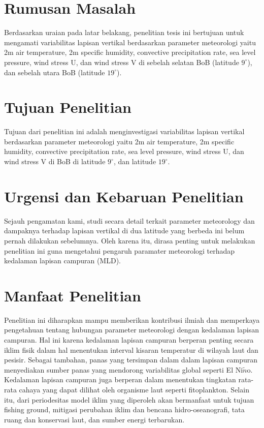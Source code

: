 \begin{spacing}{1.5}
	\section[Rumusan Masalah]{Rumusan Masalah}
	Berdasarkan uraian pada latar belakang, penelitian tesis ini bertujuan untuk mengamati variabilitas lapisan vertikal berdasarkan parameter meteorologi yaitu 2m air temperature, 2m specific humidity, convective precipitation rate, sea level pressure, wind stress U, dan wind stress V di sebelah selatan BoB (latitude $9^\circ$), dan sebelah utara BoB (latitude $19^\circ$).
	
	\section[Tujuan Penelitian]{Tujuan Penelitian}
	
	Tujuan dari penelitian ini adalah menginvestigasi variabilitas lapisan vertikal berdasarkan parameter meteorologi yaitu 2m air temperature, 2m specific humidity, convective precipitation rate, sea level pressure, wind stress U, dan wind stress V di BoB di latitude $9^\circ$, dan latitude $19^\circ$. 
	
	\section[Urgensi dan Kebaruan Penelitian]{Urgensi dan Kebaruan Penelitian}

	Sejauh pengamatan kami, studi secara detail terkait parameter meteorology dan dampaknya terhadap lapisan vertikal di dua latitude yang berbeda ini belum pernah dilakukan sebelumnya. Oleh karena itu, dirasa penting untuk melakukan penelitian ini guna mengetahui pengaruh paramater meteorologi terhadap kedalaman lapisan campuran (MLD).

	\section[Manfaat Penelitian]{Manfaat Penelitian}
	
	Penelitian ini diharapkan mampu memberikan kontribusi ilmiah dan memperkaya pengetahuan tentang hubungan parameter meteorologi dengan kedalaman lapisan campuran. Hal ini karena kedalaman lapisan campuran berperan penting secara iklim fisik dalam hal menentukan interval kisaran temperatur di wilayah laut dan pesisir. Sebagai tambahan, panas yang tersimpan dalam dalam lapisan campuran menyediakan sumber panas yang mendorong variabilitas global seperti El Ni$\tilde{n}$o. Kedalaman lapisan campuran juga berperan dalam menentukan tingkatan rata-rata cahaya yang dapat dilihat oleh organisme laut seperti fitoplankton. Selain itu, dari periodesitas model iklim yang diperoleh akan bermanfaat untuk tujuan fishing ground, mitigasi perubahan iklim dan bencana hidro-oseanografi, tata ruang dan konservasi
	laut, dan sumber energi terbarukan. 


\end{spacing}
